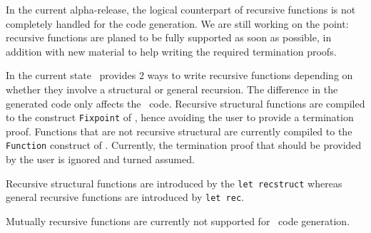 In the current alpha-release, the logical counterpart of recursive
functions is not completely handled for the {\coq} code generation. We
are still working on the point: recursive functions are planed to be
fully supported as soon as possible, in addition with new material to
help writing the required termination proofs.

In the current state \focalize\ provides 2 ways to write recursive
functions depending on whether they involve a structural or general
recursion. The difference in the generated code only affects the
\coq\ code. Recursive structural functions are compiled to the
construct {\tt Fixpoint} of \coq, hence avoiding the user to provide a
termination proof. Functions that are not recursive structural are
currently compiled to the {\tt Function} construct of \coq. Currently,
the termination proof that should be provided by the user is ignored
and turned assumed.

Recursive structural functions are introduced by the {\tt let recstruct}
whereas general recursive functions are introduced by {\tt let rec}.

Mutually recursive functions are currently not supported for \coq\
code generation.
